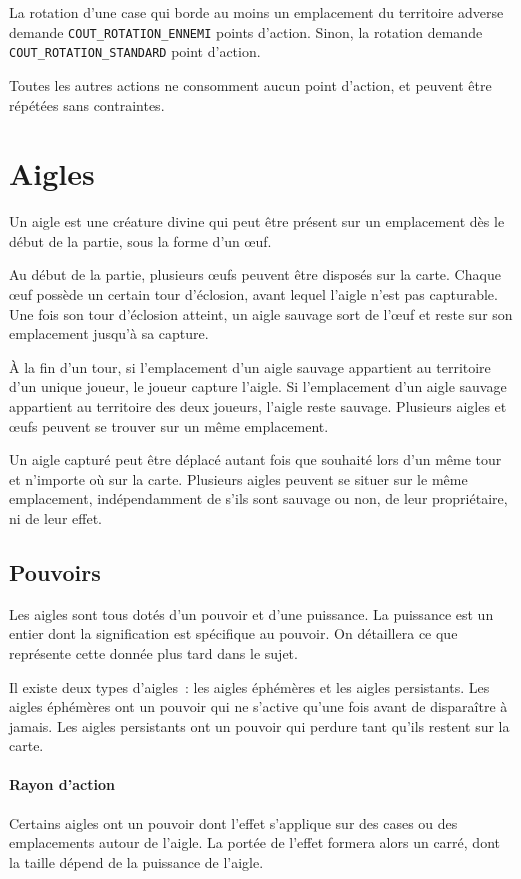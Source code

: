 La rotation d'une case qui borde au moins un emplacement du territoire adverse
demande \texttt{COUT\_ROTATION\_ENNEMI} points d'action.
Sinon, la rotation demande \texttt{COUT\_ROTATION\_STANDARD} point d'action.

Toutes les autres actions ne consomment aucun point d'action, et peuvent
être répétées sans contraintes.

\section{Aigles}
Un aigle est une créature divine qui peut être présent sur un emplacement
dès le début de la partie, sous la forme d'un œuf.

Au début de la partie, plusieurs œufs peuvent être disposés sur la carte.
Chaque œuf possède un certain tour d'éclosion, avant lequel l'aigle n'est
pas capturable. 
Une fois son tour d'éclosion atteint, un aigle sauvage sort de l'œuf
et reste sur son emplacement jusqu'à sa capture.

À la fin d'un tour, si l'emplacement d'un aigle sauvage appartient au
territoire d'un unique joueur, le joueur capture l'aigle.
Si l'emplacement d'un aigle sauvage appartient au territoire des deux joueurs,
l'aigle reste sauvage.
Plusieurs aigles et œufs peuvent se trouver sur un même emplacement.

Un aigle capturé peut être déplacé autant fois que souhaité lors d'un même tour
et n'importe où sur la carte.
Plusieurs aigles peuvent se situer sur le même emplacement, indépendamment
de s'ils sont sauvage ou non, de leur propriétaire, ni de leur effet.


\subsection{Pouvoirs}

Les aigles sont tous dotés d'un pouvoir et d'une puissance.
La puissance est un entier dont la signification est spécifique au pouvoir.
On détaillera ce que représente cette donnée plus tard dans le sujet.

Il existe deux types d'aigles~: les aigles éphémères et les aigles persistants.
Les aigles éphémères ont un pouvoir qui ne s'active qu'une fois avant de
disparaître à jamais.
Les aigles persistants ont un pouvoir qui perdure tant qu'ils restent sur la
carte.

\paragraph{Rayon d'action}
Certains aigles ont un pouvoir dont l'effet s'applique sur des cases ou des
emplacements autour de l'aigle.
La portée de l'effet formera alors un carré, dont la taille dépend de la
puissance de l'aigle.

